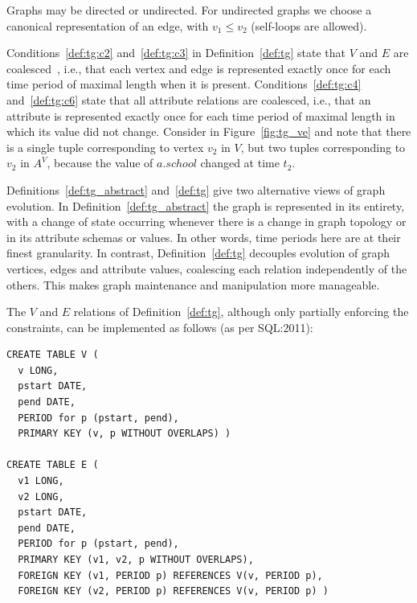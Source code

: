 Graphs may be directed or undirected.  For undirected graphs we choose
a canonical representation of an edge, with $v_1 \leq v_2$ (self-loops
are allowed).

Conditions~\ref{def:tg:c2} and~\ref{def:tg:c3} in
Definition~\ref{def:tg} state that $V$ and $E$ are
coalesced~\cite{DBLP:conf/vldb/BohlenSS96}, i.e., that each vertex and
edge is represented exactly once for each time period of maximal
length when it is present.  Conditions~\ref{def:tg:c4}
and~\ref{def:tg:c6} state that all attribute relations are coalesced,
i.e., that an attribute is represented exactly once for each time
period of maximal length in which its value did not change.  Consider
 in Figure~\ref{fig:tg_ve} and note that there is a single
tuple corresponding to vertex $v_2$ in $V$, but two tuples
corresponding to $v_2$ in $A^{V}$, because the value of $a.school$
changed at time $t_2$.

Definitions~\ref{def:tg_abstract} and~\ref{def:tg} give two
alternative views of graph evolution.  In
Definition~\ref{def:tg_abstract} the graph is represented in its
entirety, with a change of state occurring whenever there is a change
in graph topology or in its attribute schemas or values.  In other
words, time periods here are at their finest granularity.  In
contrast, Definition~\ref{def:tg} decouples evolution of graph
vertices, edges and attribute values, coalescing each relation
independently of the others.  This makes graph maintenance and
manipulation more manageable.

The $V$ and $E$ relations of Definition~\ref{def:tg}, although only
partially enforcing the constraints, can be implemented as follows (as
per SQL:2011):


\begin{small}
\begin{verbatim}
CREATE TABLE V (
  v LONG,
  pstart DATE,
  pend DATE,
  PERIOD for p (pstart, pend),
  PRIMARY KEY (v, p WITHOUT OVERLAPS) )

CREATE TABLE E (
  v1 LONG,
  v2 LONG,
  pstart DATE,
  pend DATE,
  PERIOD for p (pstart, pend),
  PRIMARY KEY (v1, v2, p WITHOUT OVERLAPS),
  FOREIGN KEY (v1, PERIOD p) REFERENCES V(v, PERIOD p),
  FOREIGN KEY (v2, PERIOD p) REFERENCES V(v, PERIOD p) )
\end{verbatim}
\end{small}

